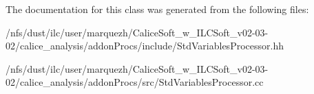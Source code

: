 The documentation for this class was generated from the following files\-:\begin{DoxyCompactItemize}
\item 
/nfs/dust/ilc/user/marquezh/\-Calice\-Soft\-\_\-w\-\_\-\-I\-L\-C\-Soft\-\_\-v02-\/03-\/02/calice\-\_\-analysis/addon\-Procs/include/Std\-Variables\-Processor.\-hh\item 
/nfs/dust/ilc/user/marquezh/\-Calice\-Soft\-\_\-w\-\_\-\-I\-L\-C\-Soft\-\_\-v02-\/03-\/02/calice\-\_\-analysis/addon\-Procs/src/Std\-Variables\-Processor.\-cc\end{DoxyCompactItemize}
